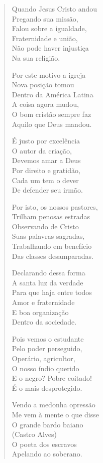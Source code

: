 \begin{verse}
Quando Jesus Cristo andou\\
Pregando sua missão,\\
Falou sobre a igualdade,\\
Fraternidade e união,\\
Não pode haver injustiça\\
Na sua religião.

Por este motivo a igreja\\
Nova posição tomou\\
Dentro da América Latina\\
A coisa agora mudou,\\
O bom cristão sempre faz\\
Aquilo que Deus mandou.

É justo por excelência\\
O autor da criação,\\
Devemos amar a Deus\\
Por direito e gratidão,\\
Cada um tem o dever\\
De defender seu irmão.

Por isto, os nossos pastores,\\
Trilham penosas estradas\\
Observando de Cristo\\
Suas palavras sagradas,\\
Trabalhando em benefício\\
Das classes desamparadas.

Declarando dessa forma\\
A santa luz da verdade\\
Para que haja entre todos\\
Amor e fraternidade\\
E boa organização\\
Dentro da sociedade.

Pois vemos o estudante\\
Pelo poder perseguido,\\
Operário, agricultor,\\
O nosso índio querido\\
E o negro? Pobre coitado!\\
É o mais desprotegido.

Vendo a medonha opressão\\
Me vem à mente o que disse\\
O grande bardo baiano\\
\quad(Castro Alves)\\
O poeta dos escravos\\
Apelando ao soberano.


\end{verse}
